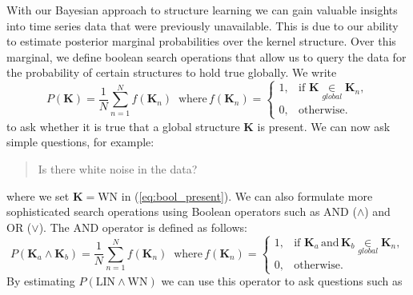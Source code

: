 With our Bayesian approach to structure learning we can gain valuable insights
into time series data that were previously unavailable.
This is due to our ability to estimate posterior marginal probabilities over the kernel structure.
Over this marginal, we define boolean search operations that allow us to query the data
for the probability of certain structures to hold true globally.
We write
\begin{equation}
\label{eq:bool_present}
P(\mathbf{K}) = \frac{1}{N}
\sum\limits_{n=1}^N f(\mathbf{K}_n)\;\;\text{where}\, f(\mathbf{K}_n) = \begin{cases}
  1, & \text{if } \mathbf{K} \underset{global}{\in} \mathbf{K}_n, \\
  0, & \text{otherwise}.
\end{cases} 
\end{equation}
to ask whether it is true that a global structure $\mathbf{K}$ is present.
We can now ask simple questions, for example:
\begin{quotation}
Is there white noise in the data?
\end{quotation}
where we set $\mathbf{K} = $WN in (\ref{eq:bool_present}).
We can also formulate more sophisticated search operations using Boolean operators such as AND ($\land$) and OR ($\lor$).
The AND operator is defined as follows:
\begin{equation}
P(\mathbf{K}_a \land \mathbf{K}_b)  = \frac{1}{N}
\sum\limits_{n=1}^N f(\mathbf{K}_n)\;\;\text{where}\,f(\mathbf{K}_n) = \begin{cases}
  1, & \text{if } \mathbf{K}_a\, \text{and}\, \mathbf{K}_b  \underset{global}{\in} \mathbf{K}_n, \\
  0, & \text{otherwise}.
\end{cases}
\end{equation}
By estimating $P(\text{LIN} \land \text{WN})$ we can use this operator to ask questions such as 

